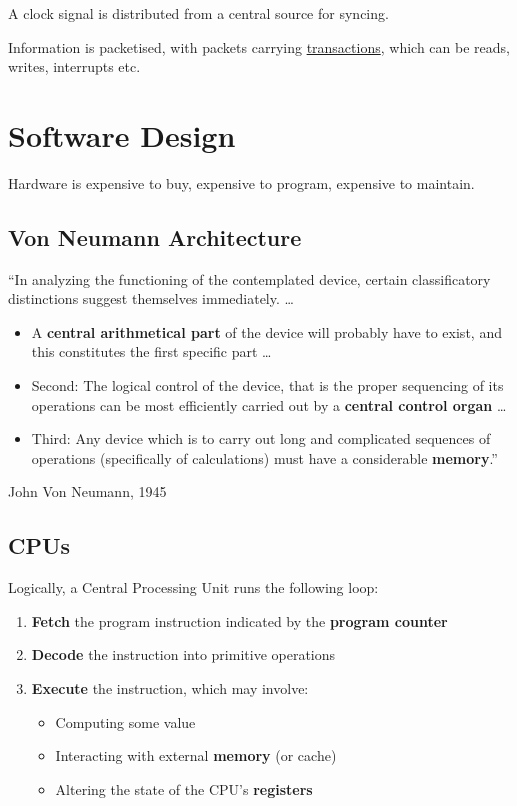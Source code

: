 \documentclass{article}
\newif\ifhasdiagram
\newcommand{\sectiondiagram}[1]{%
    \def\insertsdiagram{#1}%
    \hasdiagramtrue
}
\newcommand{\sectionquote}[1]{%
    \def\insertsquote{\small #1}%
}
\newcommand{\insertsdiagram}{}
\newcommand{\insertsquote}{}
\renewcommand{\insertsquote}{}%
\begin{document}
A clock signal is distributed from a central source for syncing.

Information is packetised, with packets carrying \href{https://docs.amd.com/r/en-US/pg194-axi-bridge-pcie-gen3/PCIe-Transaction-Type}{transactions}, which can be reads, writes, interrupts etc.

\sectiondiagram{software}
\sectionquote{``You don't need to be an engineer to be a racing driver, but you do need Mechanical Sympathy.'' Jackie Stewart}
\section{Software Design}
Hardware is expensive to buy, expensive to program, expensive to maintain. 

\subsection{Von Neumann Architecture}
\begin{block}{}
	``In analyzing the functioning of the contemplated device, certain classificatory distinctions suggest themselves immediately. \ldots

	\begin{itemize}
	\item A \textbf{central arithmetical part} of the device will probably have to exist, and this constitutes the first specific part \ldots

	\item Second: The logical control of the device, that is the proper sequencing of its operations can be most efficiently carried out by a \textbf{central control organ} \ldots

	\item Third: Any device which is to carry out long and complicated sequences of operations (specifically of calculations) must have a considerable \textbf{memory}.''
	\end{itemize}
	John Von Neumann, 1945
\end{block}

\subsection{CPUs}
Logically, a Central Processing Unit runs the following loop:
\begin{enumerate}
	\item \textbf{Fetch} the program instruction indicated by the \textbf{program counter}
	\item \textbf{Decode} the instruction into primitive operations %
	\item \textbf{Execute} the instruction, which may involve:
	\begin{itemize}
		\item Computing some value
		\item Interacting with external \textbf{memory} (or cache)
		\item Altering the state of the CPU's \textbf{registers}
	\end{itemize}
\end{enumerate}
\end{document}
